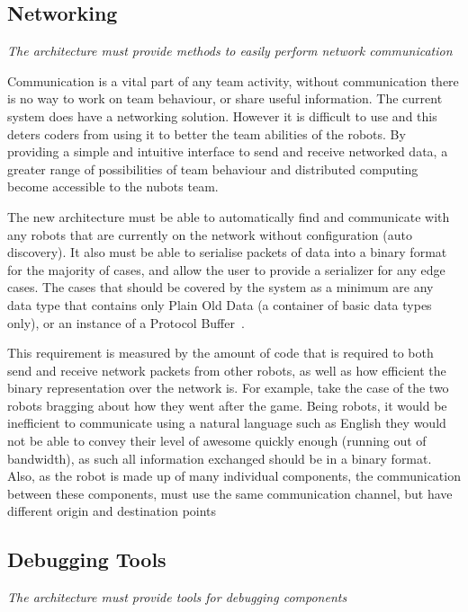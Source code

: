 \documentclass[english,12pt]{scrartcl}
\newcommand{\requirement}[1]{\textit{#1}}
\begin{document}
		\subsection{Networking}
			\requirement{The architecture must provide methods to easily perform network
			communication}

			Communication is a vital part of any team activity, without communication there is no
			way to work on team behaviour, or share useful information. The current system does have
			a networking solution. However it is difficult to use and this deters coders from using
			it to better the team abilities of the robots. By providing a simple and intuitive
			interface to send and receive networked data, a greater range of possibilities of team
			behaviour and distributed computing become accessible to the \gls{nubots} team.

			The new architecture must be able to automatically find and communicate with any robots
			that are currently on the network without configuration (auto discovery). It also must
			be able to serialise packets of data into a binary format for the majority of cases, and
			allow the user to provide a serializer for any edge cases. The cases that should be
			covered by the system as a minimum are any data type that contains only Plain Old Data
			(a container of basic data types only), or an instance of a
			Protocol Buffer~\cite{protobuf}.

			This requirement is measured by the amount of code that is required to both send and
			receive network packets from other robots, as well as how efficient the binary
			representation over the network is. For example, take the case of the two robots
			bragging about how they went after the game. Being robots, it would be inefficient to
			communicate using a natural language such as English they would not be able to convey
			their level of awesome quickly enough (running out of bandwidth), as such all
			information exchanged should be in a binary format. Also, as the robot is made up of
			many individual components, the communication between these components, must use the
			same communication channel, but have different origin and destination points

		\subsection{Debugging Tools}
			\requirement{The architecture must provide tools for debugging components}
\end{document}

